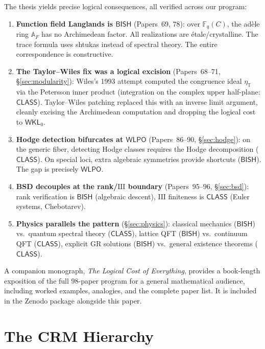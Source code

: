\documentclass[11pt,a4paper]{article}
\newcommand{\Sha}{\mathrm{III}}
\theoremstyle{plain}
\theoremstyle{definition}
\newcommand{\BISH}{\textsf{BISH}}
\newcommand{\WKL}{\textsf{WKL}_0}
\newcommand{\WLPO}{\textsf{WLPO}}
\newcommand{\CLASS}{\textsf{CLASS}}
\newcommand{\F}{\mathbb{F}}
\newcommand{\A}{\mathbb{A}}
\begin{document}
The thesis yields precise logical consequences, all verified across our program:
\begin{enumerate}[label=(\roman*)]
\item \textbf{Function field Langlands is $\BISH$} (Papers~69, 78): over $\F_q(C)$, the ad\`ele ring $\A_F$ has no Archimedean factor. All realizations are \'etale/crystalline. The trace formula uses shtukas instead of spectral theory. The entire correspondence is constructive.

\item \textbf{The Taylor--Wiles fix was a logical excision} (Papers~68--71, \S\ref{sec:modularity}): Wiles's 1993 attempt computed the congruence ideal $\eta_\mathbb{T}$ via the Petersson inner product (integration on the complex upper half-plane: $\CLASS$). Taylor--Wiles patching replaced this with an inverse limit argument, cleanly excising the Archimedean computation and dropping the logical cost to $\WKL$.

\item \textbf{Hodge detection bifurcates at $\WLPO$} (Papers~86--90, \S\ref{sec:hodge}): on the generic fiber, detecting Hodge classes requires the Hodge decomposition ($\CLASS$). On special loci, extra algebraic symmetries provide shortcuts ($\BISH$). The gap is precisely $\WLPO$.

\item \textbf{BSD decouples at the rank/$\Sha$ boundary} (Papers~95--96, \S\ref{sec:bsd}): rank verification is $\BISH$ (algebraic descent), $\Sha$ finiteness is $\CLASS$ (Euler systems, Chebotarev). 

\item \textbf{Physics parallels the pattern} (\S\ref{sec:physics}): classical mechanics ($\BISH$) vs.\ quantum spectral theory ($\CLASS$), lattice QFT ($\BISH$) vs.\ continuum QFT ($\CLASS$), explicit GR solutions ($\BISH$) vs.\ general existence theorems ($\CLASS$).
\end{enumerate}

\noindent A companion monograph, \emph{The Logical Cost of Everything}, provides a book-length exposition of the full 98-paper program for a general mathematical audience, including worked examples, analogies, and the complete paper list. It is included in the Zenodo package alongside this paper.


\section{The CRM Hierarchy}\label{sec:crm}
\end{document}
